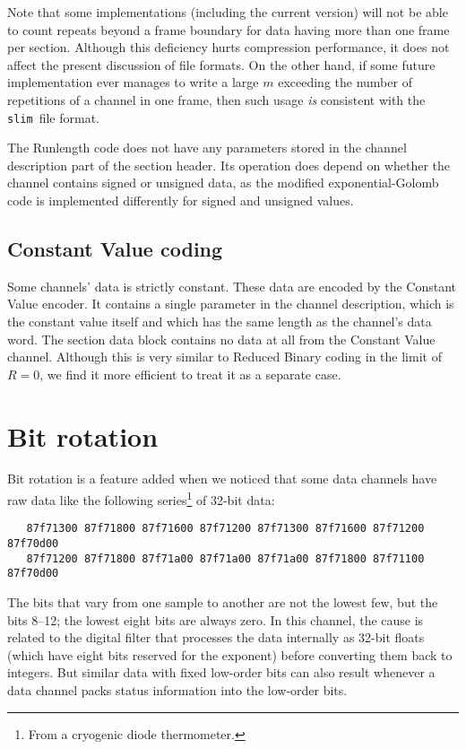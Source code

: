 \documentclass[11pt]{article}
\newcommand{\slim}{{\tt slim}}
\begin{document}
Note that some implementations (including the current version) will
not be able to count repeats beyond a frame boundary for data having
more than one frame per section.  Although this deficiency hurts
compression performance, it does not affect the present discussion of
file formats.  On the other hand, if some future implementation ever
manages to write a large $m$ exceeding the number of repetitions of a
channel in one frame, then such usage \emph{is} consistent with the
\slim\ file format.

The Runlength code does not have any parameters stored in the channel
description part of the section header.  Its operation does
depend on whether the channel contains signed or unsigned data, as the
modified exponential-Golomb code is implemented differently for signed
and unsigned values.

\subsection{Constant Value coding}
\label{sec:constant}

Some channels' data is strictly constant.  These data are encoded by
the Constant Value encoder.  It contains a single parameter in the
channel description, which is the constant value itself and which has
the same length as the channel's data word.  The section data block
contains no data at all from the Constant Value channel.  Although
this is very similar to Reduced Binary coding in the limit of $R=0$,
we find it more efficient to treat it as a separate case.

\section{Bit rotation}
\label{sec:bit_rotation}

Bit rotation is a feature added when we noticed that some data
channels have raw data like the following series\footnote{From a
  cryogenic diode thermometer.} of 32-bit data:
\begin{verbatim}
   87f71300 87f71800 87f71600 87f71200 87f71300 87f71600 87f71200 87f70d00
   87f71200 87f71800 87f71a00 87f71a00 87f71a00 87f71800 87f71100 87f70d00
\end{verbatim}

The bits that vary from one sample to another are not the lowest few,
but the bits 8--12; the lowest eight bits are always zero.  In
this channel, the cause is related to the digital filter that
processes the data internally as 32-bit floats (which have eight bits
reserved for the exponent) before converting them back to integers.
But similar data with fixed low-order bits can also result whenever a
data channel packs status information into the low-order bits.
\end{document}
